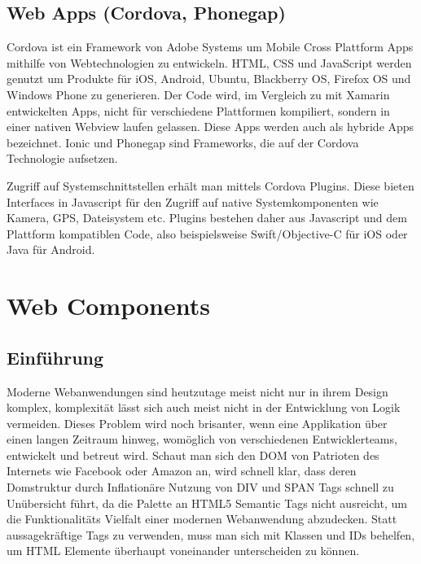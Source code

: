 \newpage


\subsection{Web Apps (Cordova, Phonegap)}

Cordova ist ein Framework von Adobe Systems um Mobile Cross Plattform Apps mithilfe von Webtechnologien zu entwickeln.
HTML, CSS und JavaScript werden genutzt um Produkte für iOS, Android, Ubuntu, Blackberry OS, Firefox OS und Windows Phone zu generieren.\cite{Cordo26:online}
Der Code wird, im Vergleich zu mit Xamarin entwickelten Apps, nicht für verschiedene Plattformen kompiliert,
sondern in einer nativen Webview laufen gelassen. Diese Apps werden auch als hybride Apps bezeichnet.
Ionic und Phonegap sind Frameworks, die auf der Cordova Technologie aufsetzen.

Zugriff auf Systemschnittstellen erhält man mittels Cordova Plugins. Diese bieten
Interfaces in Javascript für den Zugriff auf native Systemkomponenten wie Kamera, GPS, Dateisystem etc.
Plugins bestehen daher aus Javascript und dem Plattform kompatiblen Code,
also beispielsweise Swift/Objective-C für iOS oder Java für Android.

\vspace{1cm}

\vspace{1cm}

\newpage
\section{Web Components}


\subsection{Einführung}

Moderne Webanwendungen sind heutzutage meist nicht nur in ihrem Design komplex, komplexität lässt sich auch meist nicht in der Entwicklung
von Logik vermeiden. Dieses Problem wird noch brisanter, wenn eine Applikation über einen langen Zeitraum hinweg,
womöglich von verschiedenen Entwicklerteams, entwickelt und betreut wird. Schaut man sich den DOM von Patrioten des Internets wie Facebook oder Amazon an,
wird schnell klar, dass deren Domstruktur durch Inflationäre Nutzung von DIV und SPAN Tags schnell zu Unübersicht führt,
da die Palette an HTML5 Semantic Tags nicht ausreicht, um die Funktionalitäts Vielfalt einer modernen Webanwendung abzudecken.
Statt aussagekräftige Tags zu verwenden, muss man sich mit Klassen und IDs behelfen, um HTML Elemente überhaupt voneinander unterscheiden zu können.
\cite{sitepoint-introduction-to-webcomponents}

